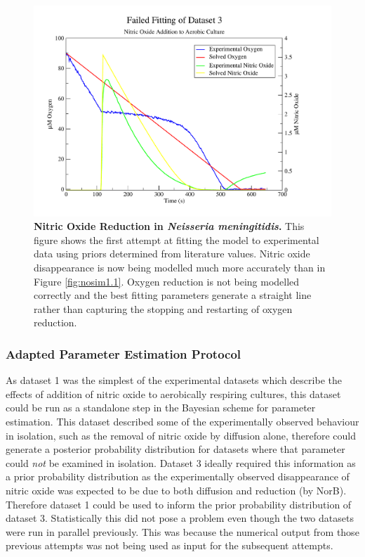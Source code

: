 \begin{figure}[tbp]
 \centering
 \includegraphics[width=15cm, trim=1cm 1cm 3cm 1cm, clip=true]{./06-noreduction/data/aer-no-sim3.pdf}
 \caption[{Nitric Oxide Reduction in \textit{Neisseria meningitidis}.}]{{\bf Nitric Oxide Reduction in \textit{Neisseria meningitidis}.} This figure shows the first attempt at fitting the model to experimental data using priors determined from literature values. Nitric oxide disappearance is now being modelled much more accurately than in Figure \ref{fig:nosim1.1}. Oxygen reduction is not being modelled correctly and the best fitting parameters generate a straight line rather than capturing the stopping and restarting of oxygen reduction.}
 \label{fig:nosim3.1}
\end{figure}

\subsubsection{Adapted Parameter Estimation Protocol}

As dataset 1 was the simplest of the experimental datasets which describe the effects of addition of nitric oxide to aerobically respiring cultures, this dataset could be run as a standalone step in the Bayesian scheme for parameter estimation. This dataset described some of the experimentally observed behaviour in isolation, such as the removal of nitric oxide by diffusion alone, therefore could generate a posterior probability distribution for datasets where that parameter could \textit{not} be examined in isolation. Dataset 3 ideally required this information as a prior probability distribution as the experimentally observed disappearance of nitric oxide was expected to be due to both diffusion and reduction (by NorB). Therefore dataset 1 could be used to inform the prior probability distribution of dataset 3. Statistically this did not pose a problem even though the two datasets were run in parallel previously. This was because the numerical output from those previous attempts was not being used as input for the subsequent attempts.

